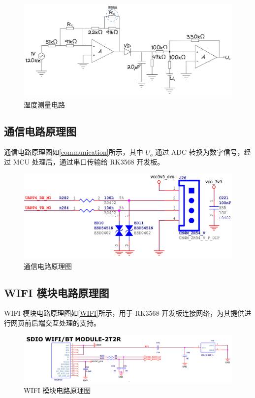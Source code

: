 \documentclass[12pt,hyperref,a4paper,UTF8]{ctexart}
\begin{document}
\begin{figure}[htbp]
    \centering
    \includegraphics[width =.8\textwidth]{figures/Humidity_sensor.png}
    \caption{湿度测量电路}
    \label{Humidity_sensor}
\end{figure}

\subsection{通信电路原理图}
通信电路原理图如\autoref{communication}所示，其中 $U_o$ 通过 ADC 转换为数字信号，经过 MCU 处理后，通过串口传输给 RK3568 开发板。
\begin{figure}[htbp]
    \centering
    \includegraphics[width =.6\textwidth]{figures/UART.png}
    \caption{通信电路原理图}
    \label{communication}
\end{figure}

\subsection{WIFI 模块电路原理图}
WIFI 模块电路原理图如\autoref{WIFI}所示，用于 RK3568 开发板连接网络，为其提供进行网页前后端交互处理的支持。
\begin{figure}[htbp]
    \centering
    \includegraphics[width =1\textwidth]{figures/WIFI.png}
    \caption{WIFI 模块电路原理图}
    \label{WIFI}
\end{figure}
\end{document}
